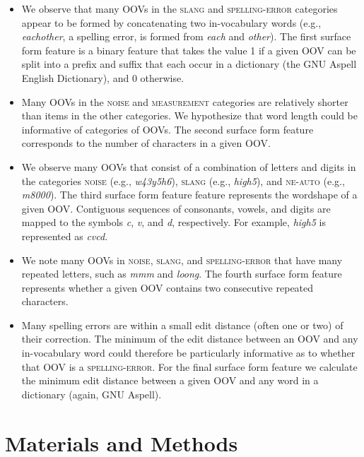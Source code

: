 \documentclass[10pt, a4paper]{article}
\begin{document}
\begin{itemize}

\item We observe that many OOVs in the \textsc{slang} and
  \textsc{spelling-error} categories appear to be formed by
  concatenating two in-vocabulary words (e.g., \emph{eachother}, a
  spelling error, is formed from \emph{each} and \emph{other}). The
  first surface form feature is a binary feature that takes the value
  1 if a given OOV can be split into a prefix and suffix that each
  occur in a dictionary (the GNU Aspell English Dictionary), and 0
  otherwise.

\item Many OOVs in the \textsc{noise} and \textsc{measurement}
  categories are relatively shorter than items in the other
  categories. We hypothesize that word length could be informative of
  categories of OOVs. The second surface form feature corresponds to
  the number of characters in a given OOV.

\item We observe many OOVs that consist of a combination of letters
  and digits in the categories \textsc{noise} (e.g., \emph{w43y5h6}),
  \textsc{slang} (e.g., \emph{high5}), and \textsc{ne-auto} (e.g.,
  \emph{m8000}). The third surface form feature feature represents the
  wordshape of a given OOV. Contiguous sequences of consonants,
  vowels, and digits are mapped to the symbols \emph{c}, \emph{v}, and
  \emph{d}, respectively. For example, \emph{high5} is represented as
  \emph{cvcd}.

\item We note many OOVs in \textsc{noise}, \textsc{slang}, and
  \textsc{spelling-error} that have many repeated letters, such as
  \emph{mmm} and \emph{loong}. The fourth surface form feature
  represents whether a given OOV contains two consecutive repeated
  characters.

\item Many spelling errors are within a small edit distance (often one
  or two) of their correction. The minimum of the edit distance
  between an OOV and any in-vocabulary word could therefore be
  particularly informative as to whether that OOV is a
  \textsc{spelling-error}. For the final surface form feature we
  calculate the minimum edit distance between a given OOV and any word
  in a dictionary (again, GNU Aspell).

\end{itemize}

\section{Materials and Methods}
\end{document}
